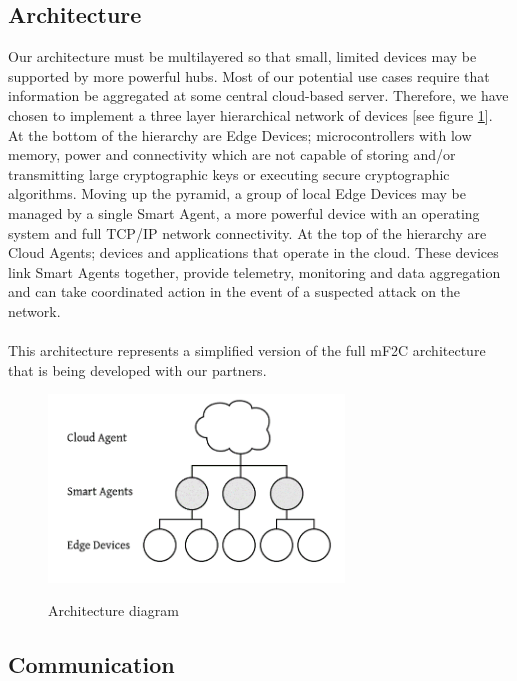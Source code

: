 \subsection{Architecture}

Our architecture must be multilayered so that small, limited devices may be supported by more powerful hubs. Most of our potential use cases require that information be aggregated at some central cloud-based server. Therefore, we have chosen to implement a three layer hierarchical network of devices [see figure \ref{fig:simplified_architecture}]. At the bottom of the hierarchy are Edge Devices; microcontrollers with low memory, power and connectivity which are not capable of storing and/or transmitting large cryptographic keys or executing secure cryptographic algorithms. Moving up the pyramid, a group of local Edge Devices may be managed by a single Smart Agent, a more powerful device with an operating system and full TCP/IP network connectivity. At the top of the hierarchy are Cloud Agents; devices and applications that operate in the cloud. These devices link Smart Agents together, provide telemetry, monitoring and data aggregation and can take coordinated action in the event of a suspected attack on the network.

\paragraph{}
This architecture represents a simplified version of the full mF2C architecture that is being developed with our partners.

\begin{figure}[h]
  \centering
    \includegraphics[width=0.7\textwidth]{simplified_architecture}
    \label{fig:simplified_architecture}
    \caption{Architecture diagram}
\end{figure}


\subsection{Communication}

